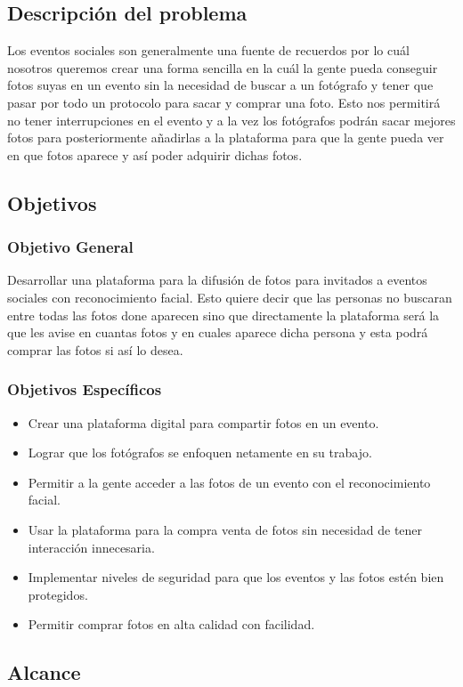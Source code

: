 \documentclass[a4paper, 12pt]{article}
\begin{document}
		\subsection{Descripción del problema}
			Los eventos sociales son generalmente una fuente de recuerdos por lo cuál nosotros queremos crear una forma sencilla en la cuál la gente pueda conseguir fotos suyas en un evento sin la necesidad de buscar a un fotógrafo y tener que pasar por todo un protocolo para sacar y comprar una foto. Esto nos permitirá no tener interrupciones en el evento y a la vez los fotógrafos podrán sacar mejores fotos para posteriormente añadirlas a la plataforma para que la gente pueda ver en que fotos aparece y así poder adquirir dichas fotos.
		\subsection{Objetivos}
			\subsubsection{Objetivo General}
				Desarrollar una plataforma para la difusión de fotos para invitados a eventos sociales con reconocimiento facial. Esto quiere decir que las personas no buscaran entre todas las fotos done aparecen sino que directamente la plataforma será la que les avise en cuantas fotos y en cuales aparece dicha persona y esta podrá comprar las fotos si así lo desea.
			\subsubsection{Objetivos Específicos}
				\begin{itemize}
					\item Crear una plataforma digital para compartir fotos en un evento.
					\item Lograr que los fotógrafos se enfoquen netamente en su trabajo.
					\item Permitir a la gente acceder a las fotos de un evento con el reconocimiento facial.
					\item Usar la plataforma para la compra venta de fotos sin necesidad de tener interacción innecesaria.
					\item Implementar niveles de seguridad para que los eventos y las fotos estén bien protegidos.
					\item Permitir comprar fotos en alta calidad con facilidad.
				\end{itemize}
		\subsection{Alcance}
\end{document}
